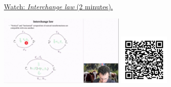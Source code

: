
\begin{minipage}{10cm}
    \href{https://act4e-spring21.netlify.app/videos/spring2021-nat-trafos:natural-trafos:interchange-law.html}{Watch: \emph{Interchange law} (2 minutes).}
        
    \href{https://act4e-spring21.netlify.app/videos/spring2021-nat-trafos:natural-trafos:interchange-law.html}{\includegraphics[height=3.5cm]{spring2021-nat-trafos:natural-trafos:interchange-law/thumbnails.jpg}}
    \href{https://act4e-spring21.netlify.app/videos/spring2021-nat-trafos:natural-trafos:interchange-law.html}{\includegraphics[height=2.5cm]{spring2021-nat-trafos:natural-trafos:interchange-law/qrcode.png}}
\end{minipage}
